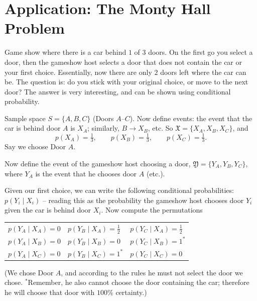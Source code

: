 \section{Application: The Monty Hall Problem}
\label{prob:sec:monty-hall}

\noindent
Game show where there is a car behind $1$ of $3$ doors. On the first go you select a door, then the gameshow host selects a door that does not contain the car or your first choice. Essentially, now there are only $2$ doors left where the car can be. The question is: do you stick with your original choice, or move to the next door? The answer is very interesting, and can be shown using conditional probability.

\begin{center}
\end{center}

\noindent
Sample space $S = \{A,B,C\}$ (Doors $A$--$C$). Now define events: the event that the car is behind door $A$ is $X_A$; similarly, $B \to X_B$, etc. So $\mathfrak{X} = \{X_A, X_B, X_C\}$, and
\[
p(X_A) = \tfrac13, \qquad p(X_B) = \tfrac13, \qquad p(X_C) = \tfrac13.
\]
Say we choose Door $A$.

\medskip
\noindent
Now define the event of the gameshow host choosing a door, $\mathfrak{Y} = \{Y_A, Y_B, Y_C\}$, where $Y_A$ is the event that he chooses door $A$ (etc.).

\medskip
\noindent
Given our first choice, we can write the following conditional probabilities: $p(Y_i \mid X_i)$ -- reading this as the probability the gameshow host chooses door $Y_i$ given the car is behind door $X_i$. Now compute the permutations
\begin{center}
\begin{tabular}{lll}
$p(Y_A\mid X_A)=0$ & $p(Y_B\mid X_A)=\tfrac12$ & $p(Y_C\mid X_A)=\tfrac12$ \\[4pt]
$p(Y_A\mid X_B)=0$ & $p(Y_B\mid X_B)=0$ & $p(Y_C\mid X_B)=1^{*}$ \\[4pt]
$p(Y_A\mid X_C)=0$ & $p(Y_B\mid X_C)=1^{*}$ & $p(Y_C\mid X_C)=0$
\end{tabular}
\end{center}
\noindent
(We chose Door $A$, and according to the rules he must not select the door we chose. $^{*}$Remember, he also cannot choose the door containing the car; therefore he will choose that door with $100\%$ certainty.)

